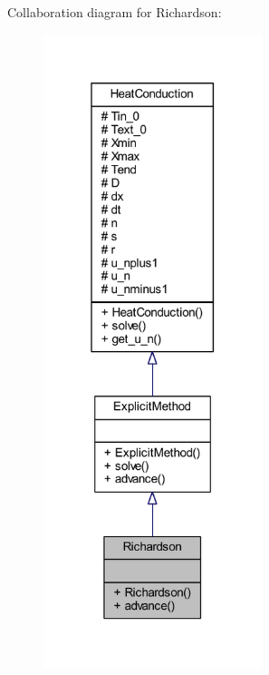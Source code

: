 Collaboration diagram for Richardson\+:
\nopagebreak
\begin{figure}[H]
\begin{center}
\leavevmode
\includegraphics[width=181pt]{class_richardson__coll__graph}
\end{center}
\end{figure}
